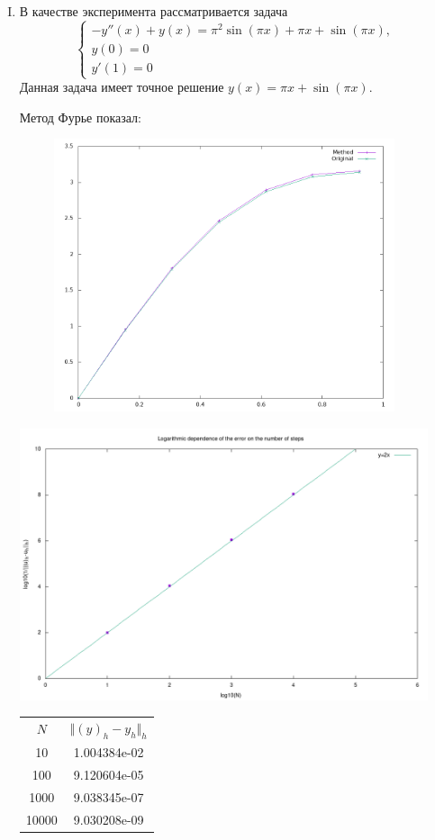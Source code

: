 \documentclass[12pt]{article}
\begin{document}
\begin{enumerate}[I.]
	\item В качестве эксперимента рассматривается задача
	      \[\begin{cases}
			      -y''(x)+y(x)=\pi^2\sin(\pi x) + \pi x + \sin(\pi x), \\
			      y(0) = 0                                             \\
			      y'(1) = 0
		      \end{cases}\]
	      Данная задача имеет точное решение $y(x) = \pi x + \sin(\pi x)$.

	      Метод Фурье показал:
	      \begin{center}
		      \includegraphics[width=12cm, height=8cm]{fourier_yn.png}

		      \includegraphics[width=12cm, height=8cm]{fourier_scale.png}

		      \begin{tabular}{c c}
			      $N$   & $\Vert(y)_h-y_h\Vert_h$ \\
			      10    & 1.004384e-02            \\
			      100   & 9.120604e-05            \\
			      1000  & 9.038345e-07            \\
			      10000 & 9.030208e-09            \\
		      \end{tabular}
	      \end{center}


\end{enumerate}
\end{document}

